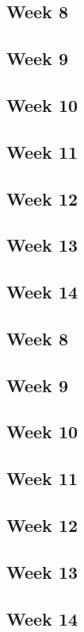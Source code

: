 \documentclass[11pt]{article}
\begin{document}
\subsection{Week 8}\label{week-8}

\subsection{Week 9}\label{week-9}

\subsection{Week 10}\label{week-10}

\subsection{Week 11}\label{week-11}

\subsection{Week 12}\label{week-12}

\subsection{Week 13}\label{week-13}

\subsection{Week 14}\label{week-14}

\subsection{Week 8}\label{week-8-1}

\subsection{Week 9}\label{week-9-1}

\subsection{Week 10}\label{week-10-1}

\subsection{Week 11}\label{week-11-1}

\subsection{Week 12}\label{week-12-1}

\subsection{Week 13}\label{week-13-1}

\subsection{Week 14}\label{week-14-1}


    
    
    
    
\end{document}
